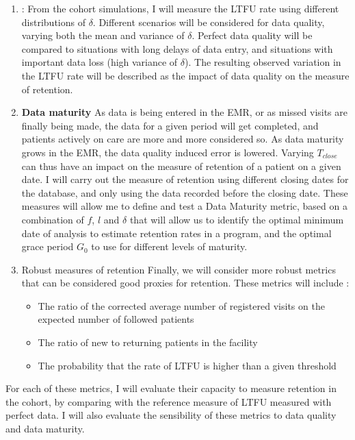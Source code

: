 \begin{enumerate}
\item {} : From the cohort simulations, I will measure the LTFU rate using different distributions  of $\delta$. Different scenarios will be considered for data quality, varying both the mean and variance of $\delta$. Perfect data quality will be compared to situations with long delays of data entry, and situations with important data loss (high variance of $\delta$). The resulting observed variation in the LTFU rate  will be described as the impact of data quality on the measure of retention.

\item \textbf{Data maturity} As data is being entered in the EMR, or as missed visits are finally being made, the data for a given period will get completed, and patients actively on care are more and more considered so. As data maturity grows in the EMR, the data quality induced error is lowered. Varying $T_{close}$ can thus have an impact on the measure of retention of a patient on a given date. I will carry out the measure of retention using different closing dates for the database, and only using the data recorded before the closing date. These measures will allow me to define and test a Data Maturity metric, based on a combination of $f$, $l$ and $\delta$ that will allow us to identify the optimal minimum date of analysis to estimate retention rates in a program, and the optimal grace period $G_0$ to use for different levels of maturity.

\item{Robust measures of retention} Finally, we will consider more robust metrics that can be considered good proxies for retention. These metrics will include :
\begin{itemize}
	\item The ratio of the corrected average number of registered visits on the expected number of followed patients
	\item The ratio of new to returning patients in the facility
	\item The probability that the rate of LTFU is higher than a given threshold
\end{itemize}
\end{enumerate}

For each of these metrics, I will evaluate their capacity to measure retention in the cohort, by comparing with the reference measure of LTFU measured with perfect data. I will also evaluate the sensibility of these metrics to data quality and data maturity.

